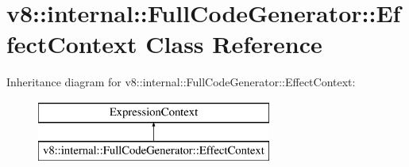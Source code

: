 \hypertarget{classv8_1_1internal_1_1_full_code_generator_1_1_effect_context}{}\section{v8\+:\+:internal\+:\+:Full\+Code\+Generator\+:\+:Effect\+Context Class Reference}
\label{classv8_1_1internal_1_1_full_code_generator_1_1_effect_context}
Inheritance diagram for v8\+:\+:internal\+:\+:Full\+Code\+Generator\+:\+:Effect\+Context\+:\begin{figure}[H]
\begin{center}
\leavevmode
\includegraphics[height=2.000000cm]{classv8_1_1internal_1_1_full_code_generator_1_1_effect_context}
\end{center}
\end{figure}

